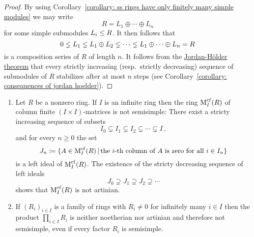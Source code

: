 \begin{proof}
  By using Corollary~\ref{corollary: ss rings have only finitely many simple modules} we may write
  \[
    R = L_1 \oplus \dotsb \oplus L_n
  \]
  for some simple submodules $L_i \leq R$.
  It then follows that
  \[
                0
    \lneq L_1
    \lneq L_1 \oplus L_2
    \lneq \dotsb
    \lneq L_1 \oplus \dotsb \oplus L_n
    =           R
  \]
  is a composition series of $R$ of length $n$.
  It follows from the \hyperref[theorem: jordan hoelder theorem]{Jordan-Hölder theorem} that every strictly increasing (resp.\ strictly decreasing) sequence of submodules of $R$ stabilizes after at most $n$ steps (see Corollary~\ref{corollary: consequences of jordan hoelder}).
\end{proof}


\begin{example}
  \leavevmode
  \label{example: more non ss rings}
  \begin{enumerate}
    \item
      Let $R$ be a nonzero ring.
      If $I$ is an infinite ring then the ring $\operatorname{M}_I^{{\operatorname{cf}}}(R)$ of column finite $(I \times I)$-matrices is not semisimple:
      There exist a stricty increasing sequence of subsets
      \[
                    I_0
        \subsetneq  I_1
        \subsetneq  I_2
        \subsetneq  \dotsb
        \subsetneq  I \,,
      \]
      and for every $n \geq 0$ the set
      \[
                  J_n
        \defined  \{
                    A \in \Mat_I^{\cf}(R)
                  \suchthat
                    \text{the $i$-th column of $A$ is zero for all $i \in I_n$}
                  \}
      \]
      is a left ideal of $\operatorname{M}_I^{{\operatorname{cf}}}(R)$.
      The existence of the stricty decreasing sequence of left ideals
      \[
                    J_0
        \supsetneq  J_1
        \supsetneq  J_2
        \supsetneq  \dotsb
      \]
      shows that $\operatorname{M}_I^{{\operatorname{cf}}}(R)$ is not artinian.
    \item
      If $(R_i)_{i \in I}$ is a family of rings with $R_i \neq 0$ for infinitely many $i \in I$ then the product $\prod_{i \in I} R_i$ is neither noetherian nor artinian and therefore not semisimple, even if every factor $R_i$ is semisimple.
  \end{enumerate}
\end{example}




